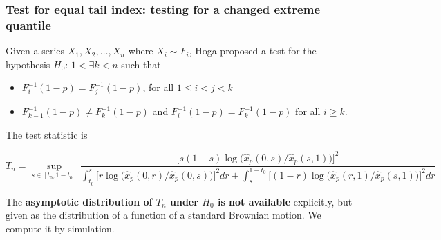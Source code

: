 \documentclass{beamer}
\begin{document}
\begin{frame}
  \frametitle{\small Test for equal tail index: testing for a changed extreme
    quantile}
  Given a series $X_1, X_2, \dots, X_n$ where $X_i \sim F_i$, Hoga
  \cite{hoga:2016} proposed a test for the hypothesis $H_0$:
  $1 < \exists k < n$ such that
  \begin{itemize}
    \item $F_i^{-1}(1 - p) = F_j^{-1}(1 - p)$, for all $1 \leq i < j < k$
    \item $F_{k-1}^{-1}(1 - p) \neq F_k^{-1}(1 - p)$ and
      $F_i^{-1}(1-p) = F_k^{-1}(1-p)$ for all $i \geq k$.
  \end{itemize}
  The test statistic is
  \begin{tiny}
  \[
  T_n = \sup_{s \in [t_0, 1 - t_0]}
  \dfrac{  \big[s (1 - s) \log \big(\hat x_p(0, s)/\hat x_p(s, 1)\big)
      \big]^2}{
    \int_{t_0}^s\big[r \log \big( \hat x_p(0, r)/\hat x_p(0, s)
      \big)
      \big]^2 dr
    +
    \int_{s}^{1 - t_0}
    \big[
      (1 - r) \log \big(
      \hat x_p(r, 1)/
      \hat x_p(s, 1)
      \big)
      \big]^2 dr}
  \]
  \end{tiny}
  The {\bf asymptotic distribution of $T_n$ under $H_0$ is not
    available} explicitly, but given as the distribution of a
  function of a standard Brownian motion. We compute it by simulation.
\end{frame}
\end{document}
